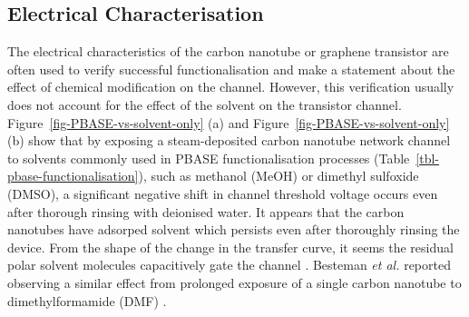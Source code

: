 \documentclass[
  a4paper,
]{scrbook}
\begin{document}
\hypertarget{sec-PBASE-electrical-characterisation}{%
\subsection{Electrical
Characterisation}\label{sec-PBASE-electrical-characterisation}}

The electrical characteristics of the carbon nanotube or graphene
transistor are often used to verify successful functionalisation and
make a statement about the effect of chemical modification on the
channel. However, this verification usually does not account for the
effect of the solvent on the transistor channel.
Figure~\ref{fig-PBASE-vs-solvent-only} (a) and
Figure~\ref{fig-PBASE-vs-solvent-only} (b) show that by exposing a
steam-deposited carbon nanotube network channel to solvents commonly
used in PBASE functionalisation processes
(Table~\ref{tbl-pbase-functionalisation}), such as methanol (MeOH) or
dimethyl sulfoxide (DMSO), a significant negative shift in channel
threshold voltage occurs even after thorough rinsing with deionised
water. It appears that the carbon nanotubes have adsorped solvent which
persists even after thoroughly rinsing the device. From the shape of the
change in the transfer curve, it seems the residual polar solvent
molecules capacitively gate the channel
\autocite{Artyukhin2006,Heller2008}. Besteman \emph{et al.} reported
observing a similar effect from prolonged exposure of a single carbon
nanotube to dimethylformamide (DMF) \autocite{Besteman2003}.
\end{document}
